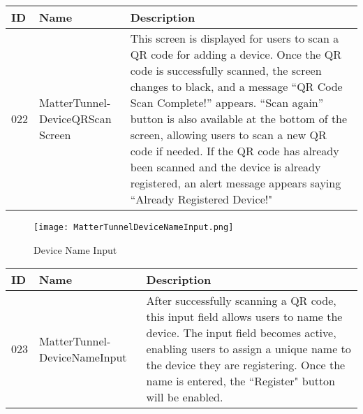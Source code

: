 \documentclass[conference]{IEEEtran}
\begin{document}
\begin{enumerate}[itemsep=2ex, parsep=1ex]
\begin{enumerate}[itemsep=2ex, parsep=1ex]
	      	      \begin{table}[h!]
	      	      	\def\arraystretch{1.24} \small
	      	      	\begin{tabular}{|p{1.2cm}|p{2.5cm}|p{4.0cm}|}
	      	      		\hline
	      	      		ID  & Name                            & Description                                                                                                                                                                                                                                                                                                                                                                                                                                                             \\
	      	      		\hline
	      	      		022 & MatterTunnel-DeviceQRScan Screen & This screen is displayed for users to scan a QR code for adding a device. Once the QR code is successfully scanned, the screen changes to black, and a message “QR Code Scan Complete!” appears. “Scan again” button is also available at the bottom of the screen, allowing users to scan a new QR code if needed. If the QR code has already been scanned and the device is already registered, an alert message appears saying ``Already Registered Device!" \\
	      	      		\hline
	      	      	\end{tabular}
	      	      \end{table}

                  \clearpage
	      	      
	      	      \begin{figure}[h!]
	      	      	\centering
	      	      	\texttt{[image: MatterTunnelDeviceNameInput.png]}
	      	      	\caption{Device Name Input}
	      	      	\label{fig:MatterTunnelDeviceNameInput}
	      	      \end{figure}
	      	      	      	      
	      	      \begin{table}[h!]
	      	      	\def\arraystretch{1.24} \small
	      	      	\begin{tabular}{|p{1.2cm}|p{2.5cm}|p{4.0cm}|}
	      	      		\hline
	      	      		ID  & Name                         & Description                                                                                                                                                                                                                                                           \\
	      	      		\hline
	      	      		023 & MatterTunnel-DeviceNameInput & After successfully scanning a QR code, this input field allows users to name the device. The input field becomes active, enabling users to assign a unique name to the device they are registering. Once the name is entered, the ``Register" button will be enabled. \\
	      	      		\hline
	      	      	\end{tabular}
	      	      \end{table}
	      	      

\end{enumerate}
\end{enumerate}
\end{document}
